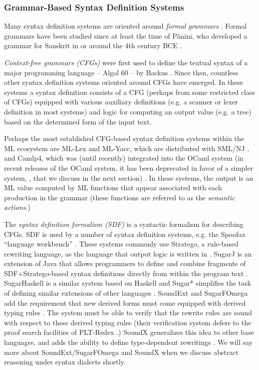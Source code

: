 \subsubsection{Grammar-Based Syntax Definition Systems}
Many syntax definition systems are oriented around \emph{formal grammars} \cite{hopcroft1979introduction}. Formal grammars have been studied since at least the time of P\~anini, who developed a grammar for Sanskrit in or around the 4th century BCE \cite{Ingerman:1967:LFS:363162.363165}. 

\emph{Context-free grammars (CFGs)} were first used to define the textual syntax of a major programming language -- Algol 60 -- by Backus \cite{naur1963revised}. Since then, countless other syntax definition systems oriented around CFGs have emerged. In these systems a syntax definition consists of a CFG (perhaps from some restricted class of CFGs) equipped with various auxiliary definitions (e.g. a scanner or lexer definition in most systems) and logic for computing an output value (e.g. a tree) based on the determined form of the input text.

Perhaps the most established CFG-based syntax definition systems within the ML ecosystem are ML-Lex  and ML-Yacc, which are distributed with SML/NJ \cite{TarditiDR:mly}, and Camlp4, which was (until recently)  integrated into  the OCaml system (in recent releases of the OCaml system, it has been deprecated in favor of a simpler system, , that we discuss in the next section) \cite{ocaml-manual}. In these systems, the output is an ML value computed by ML functions that appear associated with each production in the grammar (these functions are referred to as the \emph{semantic actions}.) 

The \emph{syntax definition formalism  (SDF)}  \cite{journals/sigplan/HeeringHKR89} is a syntactic formalism for describing CFGs. SDF is used by a number of syntax definition systems, e.g. the Spoofax ``language workbench'' \cite{kats2010spoofax}. These systems commonly use Stratego, a rule-based rewriting language, as the language that output logic is written in \cite{Visser-RTA01}. SugarJ is an extension of Java that allows programmers to define and combine fragments of SDF+Stratego-based syntax definitions directly from within the program text \cite{erdweg2011sugarj}. SugarHaskell is a similar system based on Haskell \cite{erdweg2012layout} and Sugar* simplifies the task of defining similar extensions of other languages \cite{erdweg2013framework}. SoundExt and SugarFOmega add the requirement that new derived forms must come equipped with  derived typing rules \cite{conf/icfp/LorenzenE13}. The system must be able to verify that the rewrite rules are sound with respect to these derived typing rules (their verification system defers to the proof search facilities of PLT-Redex \cite{Felleisen-Findler-Flatt09}.) SoundX generalizes this idea to other base languages, and adds the ability to define type-dependent rewritings \cite{conf/popl/LorenzenE16}. We will say more about SoundExt/SugarFOmega and SoundX when we discuss abstract reasoning under syntax dialects shortly.

